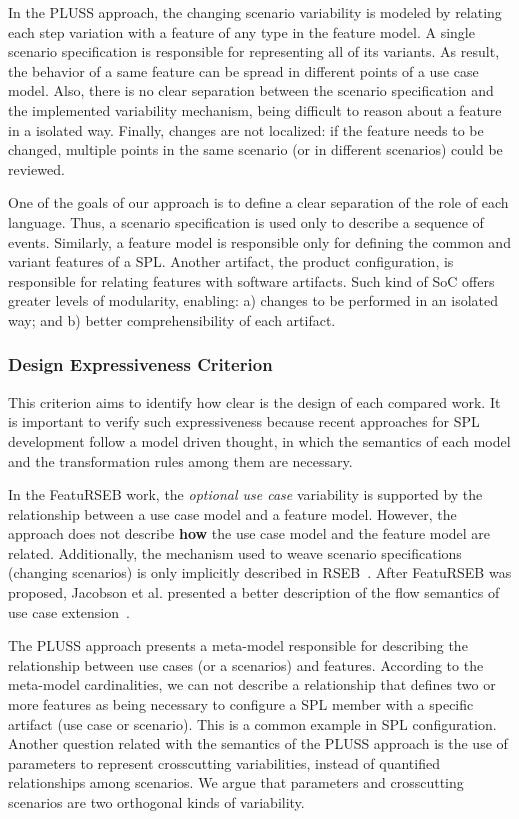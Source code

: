 \documentclass{acm_proc_article-sp}
\begin{document}
In the PLUSS approach, the changing scenario variability is modeled
by relating each step variation with a feature of any type in the
feature model. A single scenario specification is responsible for
representing all of its variants. As result, the behavior of a same
feature can be spread in different points of a use case model. Also,
there is no clear separation between the scenario specification and
the implemented variability mechanism, being difficult to reason
about a feature in a isolated way. Finally, changes are not
localized: if the feature needs to be changed, multiple points in
the same scenario (or in different scenarios) could be reviewed.

One of the goals of our approach is to define a clear separation of
the role of each language. Thus, a scenario specification
is used only to describe a sequence of events. Similarly, a feature
model is responsible only for defining the common and
variant features of a SPL. Another artifact, the product
configuration, is responsible for relating features with software
artifacts. Such kind of SoC offers greater levels of modularity,
enabling: a) changes to be performed in an isolated way; and b)
better comprehensibility of each artifact.

\subsubsection{Design Expressiveness Criterion}

This criterion aims to identify how clear is the design of each compared
work. It is important to verify such expressiveness because recent approaches
for SPL development follow a model driven thought, in which the semantics of
each model and the transformation rules among them are necessary.

In the FeatuRSEB work, the \emph{optional use case} variability is
supported by the relationship between a use case model and a feature
model. However, the approach does not describe {\bf how} the use
case model and the feature model are related. Additionally, the
mechanism used to weave scenario specifications (changing scenarios)
is only implicitly described in RSEB~\cite{jacobson-reuse-book}.
After FeatuRSEB was proposed, Jacobson et al. presented a better
description of the flow semantics of use case extension~\cite{jacobson-aosd-book}.

The PLUSS approach presents a meta-model responsible for describing
the relationship between use cases (or a scenarios) and features.
According  to the meta-model cardinalities, we can not describe a
relationship that defines two or more features as being necessary to
configure a SPL member with a specific artifact (use case or
scenario). This is a common example in SPL configuration. Another
question related with the semantics of the PLUSS approach is the use
of parameters to represent crosscutting variabilities, instead of
quantified relationships among scenarios. We argue that parameters
and crosscutting scenarios are two orthogonal kinds of variability. 
\end{document}
